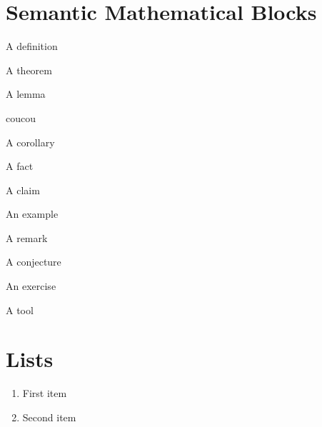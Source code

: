 \section{Semantic Mathematical Blocks}

\begin{definition}
    A definition
\end{definition}

\begin{theorem}
    A theorem
\end{theorem}

\begin{lemma}
    A lemma
\end{lemma}

\begin{proposition}
    coucou
\end{proposition}

\begin{corollary}
    A corollary
\end{corollary}

\begin{fact}
    A fact
\end{fact}

\begin{claim}
    A claim
\end{claim}

\begin{example}
    An example
\end{example}

\begin{remark}
    A remark
\end{remark}

\begin{conjecture}
    A conjecture
\end{conjecture}

\begin{exercise}
    An exercise
\end{exercise}

\begin{tool}
    A tool
\end{tool}

\section{Lists}

\begin{enumerate}
    \item First item 
    \item Second item
\end{enumerate}

